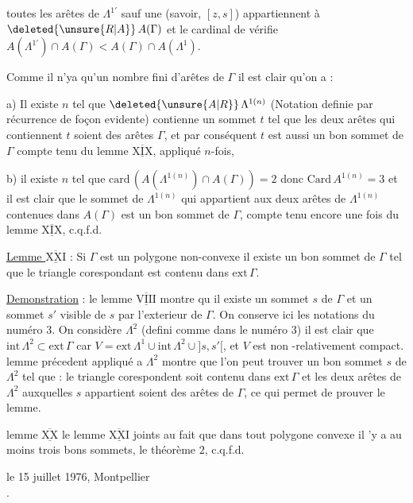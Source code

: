 toutes les  arêtes de $\Lambda^{1'}$ sauf une (savoir, $[z,s]$) appartiennent à $\deleted{\unsure{R|A}}\,A(\Gamma)$ et le cardinal de vérifie $A(\Lambda^{1'})\cap A(\Gamma)<A(\Gamma)\cap A(\Lambda^1)$.

Comme il n'ya qu'un nombre fini d'arêtes de $\Gamma$ il est clair qu'on  a :

a) Il existe $n$ tel que $\deleted{\unsure{A|R}}\,\Lambda^{1(n)}$ (Notation definie par récurrence de foçon evidente) contienne un  sommet $t$ tel que les deux arêtes qui contiennent $t$ soient des arêtes $\Gamma$, et par conséquent $t$ est aussi un bon sommet de $\Gamma$ compte tenu du lemme $\overline{\underline{\mathrm{XIX}}}$, appliqué $n$-fois, 

b) il existe $n$ tel que $\mathrm{card}\,(A({\Lambda}^{1(n)})\cap A(\Gamma))=2$ donc $\mathrm{Card}\,A^{1(n)}=3$ et il est clair que le  sommet de $\Lambda^{1(n)}$ qui appartient aux deux arêtes de $\Lambda^{1(n)}$ contenues dans $A(\Gamma)$ est un bon sommet de $\Gamma$, compte tenu encore une fois du lemme $\overline{\underline{\mathrm{XIX}}}$, c.q.f.d.

\uline{Lemme $\overline{\underline{\mathrm{XXI}}}$} : Si $\Gamma$ est un polygone non-convexe il existe un bon sommet de $\Gamma$ tel que le  triangle corespondant est contenu dans $\mathrm{ext}\,\Gamma$.

\uline{Demonstration} : le lemme $\overline{\underline{\mathrm{VIII}}}$ montre qu il existe un sommet $s$ de $\Gamma$ et un sommet $s'$ visible de $s$ par l'exterieur de $\Gamma$. On conserve ici les notations du numéro $3$. On considère $\Lambda^2$ (defini comme dans le numéro $3$) il est clair  %
que $\mathrm{int}\,\Lambda^2\subset\mathrm{ext}\,\Gamma$ car $V=\mathrm{ext}\,\Lambda^1\cup\mathrm{int}\,\Lambda^2\cup{]s,s'[}$, et $V$ est non -relativement compact.  lemme précedent appliqué a $\Lambda^2$ montre que l'on peut trouver un  bon sommet $s$ de $\Lambda^2$ tel que : le triangle corespondent soit contenu dans $\mathrm{ext}\,\Gamma$ et les deux arêtes de $\Lambda^2$ auxquelles  %
$s$ appartient soient des arêtes de $\Gamma$, ce qui permet de prouver le lemme.

 lemme $\overline{\underline{\mathrm{XX}}}$ le lemme $\overline{\underline{\mathrm{XXI}}}$ joints au fait que dans tout polygone convexe il 'y a au moins trois bons sommets,  le théorème $2$, c.q.f.d.

\begin{flushright}
le 15 juillet 1976, Montpellier\\
.
\end{flushright}

